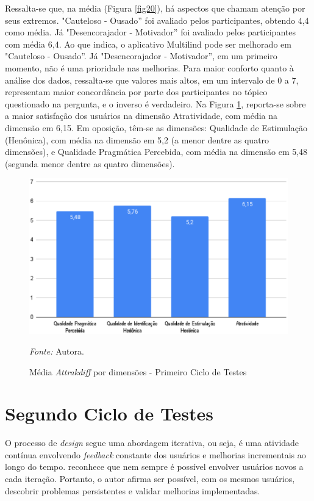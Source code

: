 Ressalta-se que, na média (Figura \ref{fig20}), há aspectos que chamam atenção por seus extremos. "Cauteloso - Ousado'' foi avaliado pelos participantes, obtendo 4,4 como média. Já "Desencorajador - Motivador'' foi avaliado pelos 
participantes com média 6,4. Ao que indica, o aplicativo Multilind pode ser melhorado em "Cauteloso - Ousado''. Já "Desencorajador - Motivador'', em um primeiro momento, não é uma prioridade nas melhorias. Para maior conforto 
quanto à análise dos dados, ressalta-se que valores mais altos, em um intervalo de 0 a 7, representam maior concordância por parte dos participantes no tópico questionado na pergunta, e o inverso é verdadeiro. Na Figura \ref{fig21}, 
reporta-se sobre a maior satisfação dos usuários na dimensão Atratividade, com média na dimensão em 6,15. Em oposição, têm-se as dimensões: Qualidade de Estimulação (Henônica), com média na dimensão em 5,2 (a menor dentre 
as quatro dimensões), e Qualidade Pragmática Percebida, com média na dimensão em 5,48 (segunda menor dentre as quatro dimensões).

\begin{figure}[h!]
	\centering
	\caption{Média \textit{Attrakdiff} por dimensões - Primeiro Ciclo de Testes}
	\begin{adjustbox}{center}
		\includegraphics[width=1\textwidth]{figuras/media-separada.eps}
	\end{adjustbox}
	\begin{tablenotes}[flushleft]
		\centering
		\item \textit{Fonte:} Autora.
	\end{tablenotes}
	\label{fig21}
\end{figure}

\section{Segundo Ciclo de Testes}
\label{sec:Segundo Ciclo}
O processo de \textit{design} segue uma abordagem iterativa, ou seja, é uma atividade contínua envolvendo \textit{feedback} constante dos usuários e melhorias incrementais ao longo do tempo.  
reconhece que nem sempre é possível envolver usuários novos a cada iteração. Portanto, o autor afirma ser possível, com os mesmos usuários, descobrir problemas persistentes e validar melhorias implementadas. 

